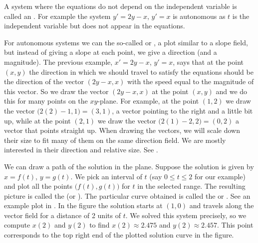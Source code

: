 A system where the equations do not depend on the independent variable
is called an \emph{}.  For example
the system $y'=2y-x$, $y'=x$ is autonomous as $t$ is the independent
variable but does not appear in the equations.

For autonomous systems we can the so-called
\emph{} or \emph{},
a plot similar to a slope field, but
instead of giving a slope at each point, we give a direction (and a
magnitude).  The previous example, $x' = 2y-x$, $y' = x$, says
that at the point $(x,y)$ the direction in which we should travel to satisfy
the equations should be the direction of the vector $( 2y-x, x )$
with the speed equal to the magnitude of this vector.  So we draw
the vector $(2y-x,x)$ at the point $(x,y)$ and we do this for
many points on the $xy$-plane.
For example, at the point $(1,2)$ we draw the vector
$\bigl(2(2)-1,1\bigr) = (3,1)$,
a vector pointing to the right and a little bit up,
while at the point $(2,1)$ we draw the vector $\bigl(2(1)-2,2\bigr) = (0,2)$
a vector that points straight up.
When drawing the vectors, we will scale down
their size to fit many of them on the same direction field.  We are mostly 
interested in their direction and relative size.  See
.

We can draw a path of the solution in the plane.  Suppose the
solution is given by $x = f(t)$, $y=g(t)$.  We pick an interval
of $t$ (say $0 \leq t \leq 2$ for our example) and plot all the points
$\bigl(f(t),g(t)\bigr)$ for $t$ in the selected range.  The resulting picture is
called the \emph{}
(or ).
The particular curve obtained
is called the \emph{} or \emph{}.
See an example plot in .
In the figure the solution starts at $(1,0)$ and travels along the vector field
for a distance of 2 units of $t$.  We solved this system precisely, so
we compute $x(2)$ and $y(2)$ to find
$x(2) \approx 2.475$ and $y(2) \approx 2.457$.  This point corresponds
to the top right end of the plotted solution curve in the figure.

\begin{myfig}
\parbox[t]{3.0in}{
 \capstart
 \caption{The direction field for $x' = 2y-x$, $y' = x$.%
 \label{sintro-vectorfield:fig}}
}
\quad
\parbox[t]{3.0in}{
 \capstart
 \caption{The direction field for $x' = 2y-x$, $y' = x$ with
 the trajectory of the solution starting at $(1,0)$
 for $0 \leq t \leq 2$.%
 \label{sintro-vectorfield-sol:fig}}
}
\end{myfig}


